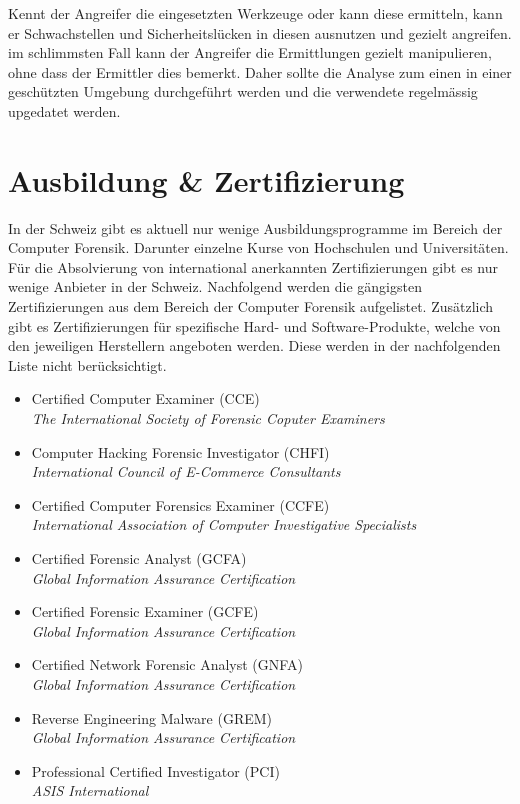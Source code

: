 Kennt der Angreifer die eingesetzten Werkzeuge oder kann diese ermitteln, kann er Schwachstellen und Sicherheitslücken in diesen ausnutzen und gezielt angreifen. im schlimmsten Fall kann der Angreifer die Ermittlungen gezielt manipulieren, ohne dass der Ermittler dies bemerkt. Daher sollte die Analyse zum einen in einer geschützten Umgebung durchgeführt werden und die verwendete regelmässig upgedatet werden.



\section{Ausbildung \& Zertifizierung}
In der Schweiz gibt es aktuell nur wenige Ausbildungsprogramme im Bereich der Computer Forensik. Darunter einzelne Kurse von Hochschulen und Universitäten. Für die Absolvierung von international anerkannten Zertifizierungen gibt es nur wenige Anbieter in der Schweiz. Nachfolgend werden die gängigsten Zertifizierungen aus dem Bereich der Computer Forensik aufgelistet. Zusätzlich gibt es Zertifizierungen für spezifische Hard- und Software-Produkte, welche von den jeweiligen Herstellern angeboten werden. Diese werden in der nachfolgenden Liste nicht berücksichtigt.

\begin{itemize}
\item Certified Computer Examiner (CCE) \\
\textit{The International Society of Forensic Coputer Examiners}

\item Computer Hacking Forensic Investigator (CHFI) \\
\textit{International Council of E-Commerce Consultants}

\item Certified Computer Forensics Examiner (CCFE) \\
\textit{International Association of Computer Investigative Specialists}

\item Certified Forensic Analyst (GCFA)\\
\textit{Global Information Assurance Certification}
\item Certified Forensic Examiner (GCFE)\\
\textit{Global Information Assurance Certification}
\item Certified Network Forensic Analyst (GNFA)\\
\textit{Global Information Assurance Certification}
\item Reverse Engineering Malware (GREM)\\
\textit{Global Information Assurance Certification}

\item Professional Certified Investigator (PCI)\\
\textit{ASIS International}
\end{itemize}


